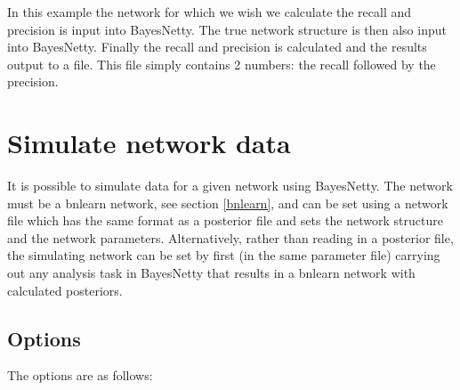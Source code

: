 \documentclass[a4paper,12pt]{article}
\begin{document}
In this example the network for which we wish we calculate the recall and precision is input into BayesNetty. The true network structure is then also input into BayesNetty. Finally the recall and precision is calculated and the results output to a file. This file simply contains 2 numbers: the recall followed by the precision. 




\section{Simulate network data}
\label{sim-data}

It is possible to simulate data for a given network using BayesNetty. The network must be a bnlearn network, see  section \ref{bnlearn}, and can be set using a network file which has the same format as a posterior file and sets the network structure and the network parameters. Alternatively, rather than reading in a posterior file, the simulating network can be set by first (in the same parameter file) carrying out any analysis task in BayesNetty that results in a bnlearn network with calculated posteriors. 
\subsection{Options}
\label{sim-data-options}

The options are as follows: 

{\begin{center}\end{center}}
\end{document}
